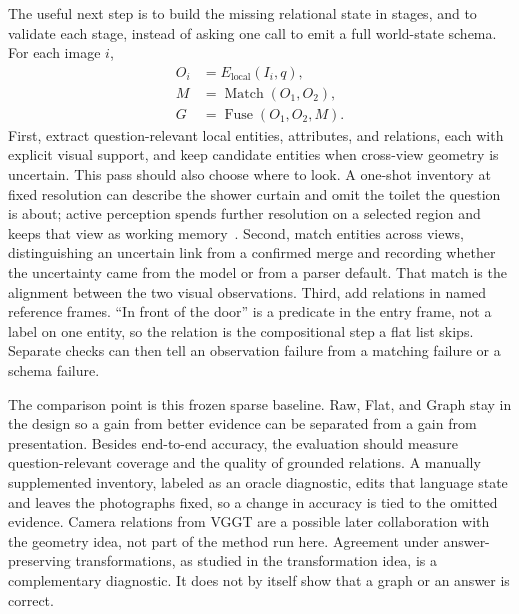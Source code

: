 The useful next step is to build the missing relational state in stages, and to validate each stage, instead of asking one call to emit a full world-state schema. For each image $i$,
\begin{equation}
\begin{aligned}
O_i &= E_{\mathrm{local}}(I_i,q),\\
M &= \operatorname{Match}(O_1,O_2),\\
G &= \operatorname{Fuse}(O_1,O_2,M).
\end{aligned}
\label{eq:worldstate-staged}
\end{equation}
First, extract question-relevant local entities, attributes, and relations, each with explicit visual support, and keep candidate entities when cross-view geometry is uncertain. This pass should also choose where to look. A one-shot inventory at fixed resolution can describe the shower curtain and omit the toilet the question is about; active perception spends further resolution on a selected region and keeps that view as working memory~\citep{wu2024vstar}. Second, match entities across views, distinguishing an uncertain link from a confirmed merge and recording whether the uncertainty came from the model or from a parser default. That match is the alignment between the two visual observations. Third, add relations in named reference frames. ``In front of the door'' is a predicate in the entry frame, not a label on one entity, so the relation is the compositional step a flat list skips. Separate checks can then tell an observation failure from a matching failure or a schema failure.

The comparison point is this frozen sparse baseline. Raw, Flat, and Graph stay in the design so a gain from better evidence can be separated from a gain from presentation. Besides end-to-end accuracy, the evaluation should measure question-relevant coverage and the quality of grounded relations. A manually supplemented inventory, labeled as an oracle diagnostic, edits that language state and leaves the photographs fixed, so a change in accuracy is tied to the omitted evidence. Camera relations from VGGT are a possible later collaboration with the geometry idea, not part of the method run here. Agreement under answer-preserving transformations, as studied in the transformation idea, is a complementary diagnostic. It does not by itself show that a graph or an answer is correct.

